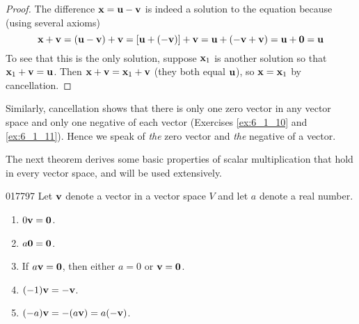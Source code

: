 \begin{proof}
The difference $\textbf{x} = \textbf{u} - \textbf{v}$ is indeed a solution to the equation because (using several axioms)
\begin{equation*}
\textbf{x} + \textbf{v} = (\textbf{u} - \textbf{v}) + \textbf{v} = [ \textbf{u} + (-\textbf{v})] + \textbf{v} = \textbf{u} + (-\textbf{v} + \textbf{v}) = \textbf{u} + \textbf{0} = \textbf{u}
\end{equation*}
To see that this is the only solution, suppose $\textbf{x}_{1}$ is another solution so that $\textbf{x}_{1} + \textbf{v} = \textbf{u}$. Then $\textbf{x} + \textbf{v} = \textbf{x}_{1} + \textbf{v}$ (they both equal $\textbf{u}$), so $\textbf{x} = \textbf{x}_{1}$ by cancellation.
\end{proof}

Similarly, cancellation shows that there is only one zero vector in any vector space and only one negative of each vector (Exercises \ref{ex:6_1_10} and \ref{ex:6_1_11}). Hence we speak of \textit{the} zero vector and \textit{the} negative of a vector.

The next theorem derives some basic properties of scalar multiplication that hold in every vector space, and will be used extensively.

\begin{theorem}{}{017797} %
Let $\textbf{v}$ denote a vector in a vector space $V$ and let $a$ denote a real number.

\begin{enumerate}
\item $0\textbf{v} = \textbf{0}$.

\item $a\textbf{0} = \textbf{0}$.

\item If $a\textbf{v} = \textbf{0}$, then either $a = 0$ or $\textbf{v} = \textbf{0}$.

\item $(-1)\textbf{v} = -\textbf{v}$.

\item $(-a)\textbf{v} = -(a\textbf{v}) = a(-\textbf{v})$.

\end{enumerate}
\end{theorem}

